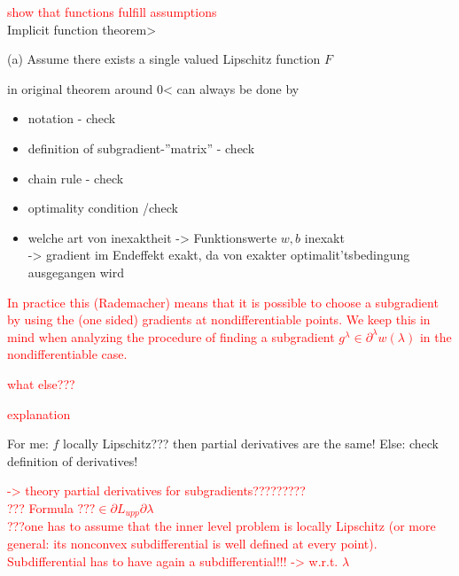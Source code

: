 \textcolor{red}{show that functions fulfill assumptions}\\

Implicit function theorem>\\
\begin{theorem}
	(a) Assume there exists a single valued  Lipschitz function \(F\)
\end{theorem}
in original theorem around 0< can always be done by 

\begin{itemize}
	\item notation - check
	\item definition of subgradient-''matrix'' - check
	\item chain rule - check
	\item optimality condition /check
\end{itemize}

\begin{itemize}
	\item welche art von inexaktheit -> Funktionswerte \(w,b\) inexakt\\
	-> gradient im Endeffekt exakt, da von exakter optimalit'tsbedingung ausgegangen wird
\end{itemize}


\textcolor{red}{In practice this (Rademacher) means that it is possible to choose a subgradient by using the (one sided) gradients at nondifferentiable points.
We keep this in mind when analyzing the procedure of finding a subgradient \( g^{\lambda} \in \partial^{\lambda} w(\lambda)\) in the nondifferentiable case.}

\textcolor{red}{what else???}

\textcolor{red}{explanation}








For me: \(f\) locally Lipschitz??? then partial derivatives are the same! Else: check definition of derivatives!

\textcolor{red}{-> theory partial derivatives for subgradients????????? \\
??? Formula \(??? \in \partial L_{upp}{\partial \lambda}\) \\
???one has to assume that the inner level problem is locally Lipschitz (or more general: its nonconvex subdifferential is well defined at every point). \\
Subdifferential has to have again a subdifferential!!! -> w.r.t. \(\lambda\)}


